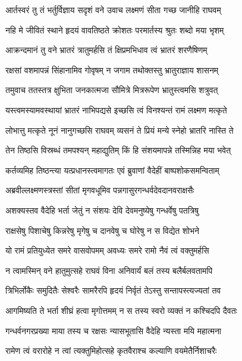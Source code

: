 
\twolineshloka
{आर्तस्वरं तु तं भर्तुर्विज्ञाय सदृशं वने}
{उवाच लक्ष्मणं सीता गच्छ जानीहि राघवम्} %

\twolineshloka
{नहि मे जीवितं स्थाने हृदयं वावतिष्ठते}
{क्रोशतः परमार्तस्य श्रुतः शब्दो मया भृशम्} %

\twolineshloka
{आक्रन्दमानं तु वने भ्रातरं त्रातुमर्हसि}
{तं क्षिप्रमभिधाव त्वं भ्रातरं शरणैषिणम्} %

\twolineshloka
{रक्षसां वशमापन्नं सिंहानामिव गोवृषम्}
{न जगाम तथोक्तस्तु भ्रातुराज्ञाय शासनम्} %

\twolineshloka
{तमुवाच ततस्तत्र क्षुभिता जनकात्मजा}
{सौमित्रे मित्ररूपेण भ्रातुस्त्वमसि शत्रुवत्} %

\twolineshloka
{यस्त्वमस्यामवस्थायां भ्रातरं नाभिपद्यसे}
{इच्छसि त्वं विनश्यन्तं रामं लक्ष्मण मत्कृते} %

\twolineshloka
{लोभात्तु मत्कृते नूनं नानुगच्छसि राघवम्}
{व्यसनं ते प्रियं मन्ये स्नेहो भ्रातरि नास्ति ते} %

\twolineshloka
{तेन तिष्ठसि विस्रब्धं तमपश्यन् महाद्युतिम्}
{किं हि संशयमापन्ने तस्मिन्निह मया भवेत्} %

\twolineshloka
{कर्तव्यमिह तिष्ठन्त्या यत्प्रधानस्त्वमागतः}
{एवं ब्रुवाणां वैदेहीं बाष्पशोकसमन्विताम्} %

\twolineshloka
{अब्रवील्लक्ष्मणस्त्रस्तां सीतां मृगवधूमिव}
{पन्नगासुरगन्धर्वदेवदानवराक्षसैः} %

\twolineshloka
{अशक्यस्तव वैदेहि भर्ता जेतुं न संशयः}
{देवि देवमनुष्येषु गन्धर्वेषु पतत्रिषु} %

\twolineshloka
{राक्षसेषु पिशाचेषु किन्नरेषु मृगेषु च}
{दानवेषु च घोरेषु न स विद्येत शोभने} %

\twolineshloka
{यो रामं प्रतियुध्येत समरे वासवोपमम्}
{अवध्यः समरे रामो नैवं त्वं वक्तुमर्हसि} %

\twolineshloka
{न त्वामस्मिन् वने हातुमुत्सहे राघवं विना}
{अनिवार्यं बलं तस्य बलैर्बलवतामपि} %

\twolineshloka
{त्रिभिर्लोकैः समुदितैः सेश्वरैः सामरैरपि}
{हृदयं निर्वृतं तेऽस्तु सन्तापस्त्यज्यतां तव} %

\twolineshloka
{आगमिष्यति ते भर्ता शीघ्रं हत्वा मृगोत्तमम्}
{न स तस्य स्वरो व्यक्तं न कश्चिदपि दैवतः} %

\twolineshloka
{गन्धर्वनगरप्रख्या माया तस्य च रक्षसः}
{न्यासभूतासि वैदेहि न्यस्ता मयि महात्मना} %

\twolineshloka
{रामेण त्वं वरारोहे न त्वां त्यक्तुमिहोत्सहे}
{कृतवैराश्च कल्याणि वयमेतैर्निशाचरैः} %

